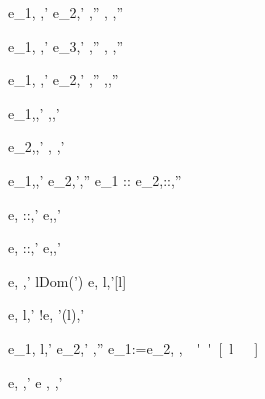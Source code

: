   {e_1,\hat{\sigma}\hat{\eval} \True,\hat{\sigma}'\Quad
   e_2,\hat{\sigma}'\hat{\eval} ,\hat{\sigma}''}
  {,\hat{\sigma}\hat{\eval} ,\hat{\sigma}''}

  {e_1,\hat{\sigma}\hat{\eval} \False,\hat{\sigma}' \Quad
   e_3,\hat{\sigma}'\hat{\eval} ,\hat{\sigma}''}
  {,\hat{\sigma}\hat{\eval} ,\hat{\sigma}''}


  {e_1,\hat{\sigma}\hat{\eval} ,\hat{\sigma}' \Quad
   e_2,\hat{\sigma}'\hat{\eval} ,\hat{\sigma}''}
  {,\hat{\sigma}\hat{\eval},\hat{\sigma}''}

  {e_1,\hat{\sigma}\hat{\eval},\hat{\sigma}'}
  {\Fst{},\hat{\sigma}\hat{\eval},\hat{\sigma}'}

  {e_2,\hat{\sigma}\hat{\eval},\hat{\sigma}'}
  {\Snd{},\hat{\sigma}\hat{\eval} ,\hat{\sigma}' }


  {e_1,\hat{\sigma}\hat{\eval},\hat{\sigma}'\Quad
   e_2,\hat{\sigma}'\hat{\eval},\hat{\sigma}''}
  {e_1 :: e_2,\hat{\sigma}\hat{\eval}::,\hat{\sigma}''}

  {e,\hat{\sigma}\hat{\eval} ::,\hat{\sigma}'}
  {\Head e,\hat{\sigma}\hat{\eval},\hat{\sigma}'}

{e,\hat{\sigma}\hat{\eval} ::,\hat{\sigma}'}
{\Tail e,\hat{\sigma}\hat{\eval},\hat{\sigma}'}



  {e,\hat{\sigma}\hat{\eval} ,\hat{\sigma}' \Quad
   l\not\in Dom(\hat{\sigma}')}
  {\Ref e,\hat{\sigma}\hat{\eval} l,\hat{\sigma}'[l\mapsto {}]}

  {e,\hat{\sigma}\hat{\eval} l,\hat{\sigma}'}
  {!e,\hat{\sigma}\hat{\eval} \hat{\sigma}'(l),\hat{\sigma}'}

  {e_1,\hat{\sigma}\hat{\eval} l,\hat{\sigma}' \Quad
   e_2,\hat{\sigma}'\hat{\eval} ,\hat{\sigma}''}
  {e_1:=e_2,\hat{\sigma}\hat{\eval} \unit,\hat{\sigma}''[l\mapsto {}]}

  {e,\hat{\sigma} \hat{\eval} ,\hat{\sigma}'}
  {\Edit e , \hat{\sigma}\hat{\eval} \Edit {},\hat{\sigma}'}

